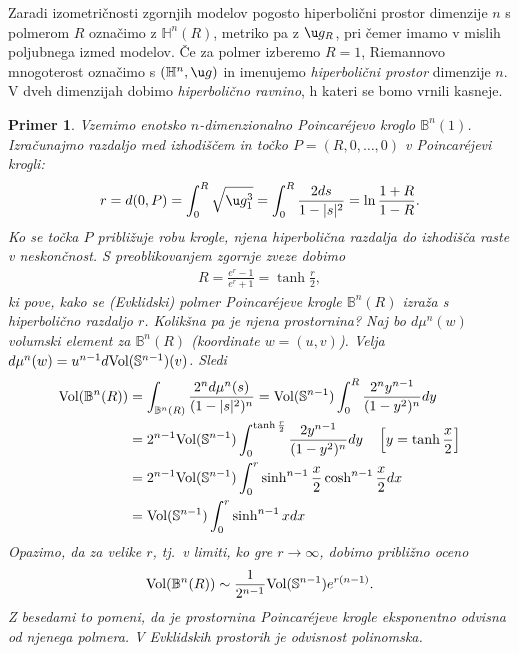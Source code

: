 \documentclass[a4paper]{article}
\newtheorem{primer}{Primer}
\begin{document}
Zaradi izometričnosti zgornjih modelov pogosto hiperbolični prostor dimenzije $n$ s polmerom $R$ označimo z $\mathbb{H}^{n}(R)$, metriko pa z $\u g_{R}$, pri čemer imamo v mislih poljubnega izmed modelov. Če za polmer izberemo $R=1$, Riemannovo mnogoterost označimo s $(\mathbb{H}^{n}, \u g)$ in imenujemo \emph{hiperbolični prostor} dimenzije $n$. V dveh dimenzijah dobimo \emph{hiperbolično ravnino}, h kateri se bomo vrnili kasneje.

\begin{primer}
Vzemimo enotsko $n$-dimenzionalno Poincar\'ejevo kroglo $\mathbb{B}^{n}(1)$. Izračunajmo razdaljo med izhodiščem in točko $P = (R,0, \dots , 0)$ v Poincar\'ejevi krogli:
\begin{gather}
r = d(0, P) = \int_{0}^{R} \sqrt{\u g_{1}^{3}} = \int_{0}^{R} \frac{2ds}{1-|s|^2} = \ln{\frac{1+R}{1-R}}.
\end{gather}
Ko se točka $P$ približuje robu krogle, njena hiperbolična razdalja do izhodišča raste v neskončnost.
S preoblikovanjem zgornje zveze dobimo 
\begin{gather}
R = \frac{e^{r}-1}{e^{r}+1} = \tanh{\frac{r}{2}},
\end{gather}
ki pove, kako se (Evklidski) polmer Poincar\'ejeve krogle $\mathbb{B}^{n}(R)$ izraža s hiperbolično razdaljo $r$.\newline 
Kolikšna pa je njena prostornina?
Naj bo $d\mu^{n}(w)$ volumski element za $\mathbb{B}^{n}(R)$ (koordinate $w=(u,v)$). Velja $d\mu^{n}(w) = u^{n-1} d\textup{Vol}(\mathbb{S}^{n-1})(v)$. Sledi 
\begin{align*}
\textup{Vol}(\mathbb{B}^{n}(R)) &= \int_{\mathbb{B}^{n}(R)} \frac{2^{n} d\mu^{n}(s)}{(1-|s|^2)^{n}} = \textup{Vol}(\mathbb{S}^{n-1}) \int_{0}^{R} \frac{2^{n} y^{n-1}}{(1-y^{2})^{n}} dy \\ 
&= 2^{n-1} \textup{Vol}(\mathbb{S}^{n-1}) \int_{0}^{\tanh{\frac{r}{2}}} \frac{2 y^{n-1}}{(1-y^{2})^{n}} dy \quad \left[y = \tanh{\frac{x}{2}} \right] \\
&= 2^{n-1} \textup{Vol}(\mathbb{S}^{n-1}) \int_{0}^{r} \sinh^{n-1}{\frac{x}{2}} \cosh^{n-1}{\frac{x}{2}} dx \\
&= \textup{Vol}(\mathbb{S}^{n-1}) \int_{0}^{r} \sinh^{n-1}{x} dx
\end{align*}
Opazimo, da za velike $r$, tj.~v limiti, ko gre $r \to \infty$, dobimo približno oceno
\begin{gather*}
\textup{Vol}(\mathbb{B}^{n}(R)) \sim \frac{1}{2^{n-1}} \textup{Vol}(\mathbb{S}^{n-1}) e^{r(n-1)}.
\end{gather*}
Z besedami to pomeni, da je prostornina Poincar\'ejeve krogle eksponentno odvisna od njenega polmera. V Evklidskih prostorih je odvisnost polinomska.
\end{primer}
\end{document}
